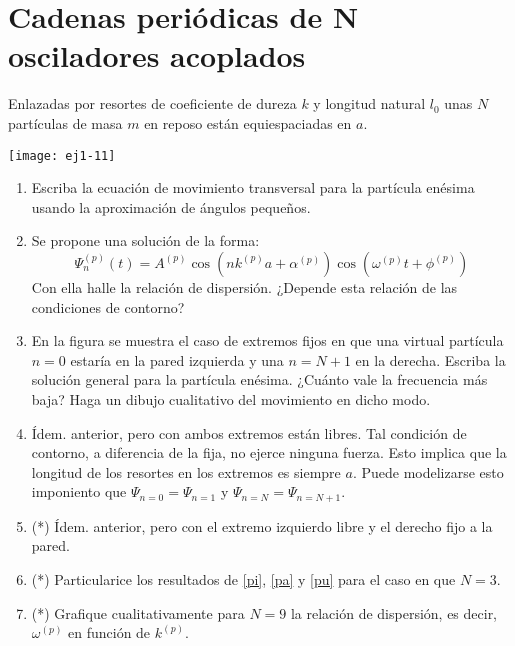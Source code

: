 \section*{Cadenas periódicas de N osciladores acoplados}


\item \label{anterior}
\begin{minipage}[t][1.4cm]{0.45\textwidth}
Enlazadas por resortes de coeficiente de dureza $k$ y longitud natural $l_0$ unas $N$ partículas de masa $m$ en reposo están equiespaciadas en $a$.
\end{minipage}
\begin{minipage}[c][1.4cm][t]{0.5\textwidth}
  \texttt{[image: ej1-11]}
\end{minipage}
\begin{enumerate}
	\item Escriba la ecuación de movimiento transversal para la partícula enésima usando la aproximación de ángulos pequeños.
	\item Se propone una solución de la forma:
	\[
		\Psi_{n}^{(p)}(t)=A^{(p)}\cos\left(nk^{(p)}a+\alpha^{(p)}\right)\cos\left(\omega^{(p)}t+\phi^{(p)}\right)
	\]
	Con ella halle la relación de dispersión.
	¿Depende esta relación de las condiciones de contorno?
	\item \label{pi} En la figura se muestra el caso de extremos fijos en que una virtual partícula $n=0$ estaría en la pared izquierda y una $n= N+1$ en la derecha.
	Escriba la solución general para la partícula enésima.
	¿Cuánto vale la frecuencia más baja?
	Haga un dibujo cualitativo del movimiento en dicho modo.
	\item \label{pa} Ídem. anterior, pero con ambos extremos están libres.
	Tal condición de contorno, a diferencia de la fija, no ejerce ninguna fuerza.
	Esto implica que la longitud de los resortes en los extremos es siempre \(a\).
	Puede modelizarse esto imponiento que \(\Psi_{n=0} = \Psi_{n=1}\) y \(\Psi_{n = N} = \Psi_{n = N+1}\).  
	\item \label{pu} (*) Ídem. anterior, pero con el extremo izquierdo libre y el derecho fijo a la pared. 
	\item (*) Particularice los resultados de \ref{pi}, \ref{pa} y \ref{pu} para el caso en que \(N = 3\).
	\item (*) Grafique cualitativamente para \(N=9\) la relación de dispersión, es decir, \(\omega^{(p)} \) en función de \(k^{(p) } \).
\end{enumerate}



